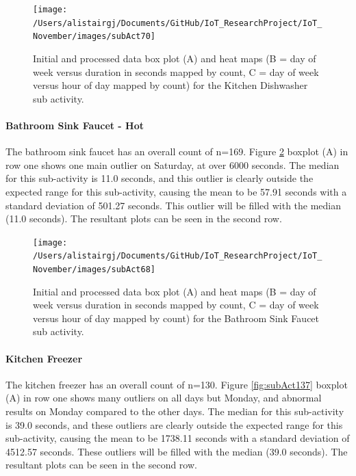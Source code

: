 \documentclass[11pt,]{article}
\let\oldparagraph\paragraph
\renewcommand{\paragraph}[1]{\oldparagraph{#1}\mbox{}}
\begin{document}
\begin{figure}[H]

{\centering \texttt{[image: /Users/alistairgj/Documents/GitHub/IoT\_ResearchProject/IoT\_November/images/subAct70]} 

}

\caption{Initial and processed data box plot (A) and heat maps (B = day of week versus duration in seconds mapped by count, C = day of week versus hour of day mapped by count) for the Kitchen Dishwasher sub activity.}\label{fig:subAct70}
\end{figure}

\hypertarget{bathroom-sink-faucet---hot}{%
\paragraph{Bathroom Sink Faucet -
Hot}\label{bathroom-sink-faucet---hot}}

The bathroom sink faucet has an overall count of n=169. Figure
\ref{fig:subAct68} boxplot (A) in row one shows one main outlier on
Saturday, at over 6000 seconds. The median for this sub-activity is 11.0
seconds, and this outlier is clearly outside the expected range for this
sub-activity, causing the mean to be 57.91 seconds with a standard
deviation of 501.27 seconds. This outlier will be filled with the median
(11.0 seconds). The resultant plots can be seen in the second row.

\begin{figure}[H]

{\centering \texttt{[image: /Users/alistairgj/Documents/GitHub/IoT\_ResearchProject/IoT\_November/images/subAct68]} 

}

\caption{Initial and processed data box plot (A) and heat maps (B = day of week versus duration in seconds mapped by count, C = day of week versus hour of day mapped by count) for the Bathroom Sink Faucet sub activity.}\label{fig:subAct68}
\end{figure}

\hypertarget{kitchen-freezer}{%
\paragraph{Kitchen Freezer}\label{kitchen-freezer}}

The kitchen freezer has an overall count of n=130. Figure
\ref{fig:subAct137} boxplot (A) in row one shows many outliers on all
days but Monday, and abnormal results on Monday compared to the other
days. The median for this sub-activity is 39.0 seconds, and these
outliers are clearly outside the expected range for this sub-activity,
causing the mean to be 1738.11 seconds with a standard deviation of
4512.57 seconds. These outliers will be filled with the median (39.0
seconds). The resultant plots can be seen in the second row.
\end{document}
